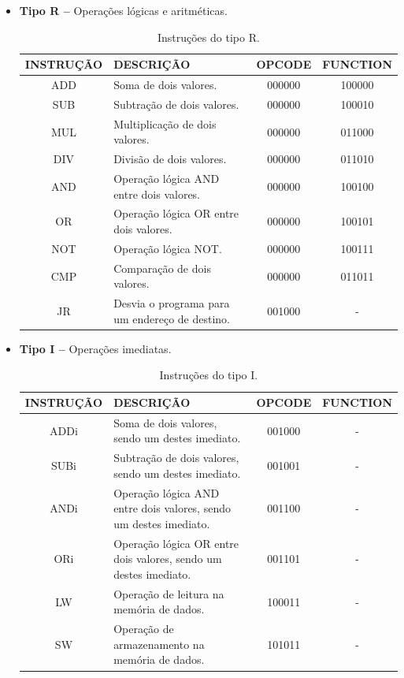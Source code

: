 \documentclass{report}
\begin{document}
  \begin{itemize}
    \item \textbf{Tipo R --} Operações lógicas e aritméticas.
    
	\begin{table}[H]
	\centering
	\begin{tabular}{|c|m{6cm}|c|c|}
  	\hline 
  	\textbf{INSTRUÇÃO} & \textbf{DESCRIÇÃO} & \textbf{OPCODE} & \textbf{FUNCTION} \\ 
  	\hline   	
  	ADD & Soma de dois valores. & 000000 & 100000 \\ \hline
  	SUB & Subtração de dois valores. & 000000 & 100010 \\ \hline
  	MUL & Multiplicação de dois valores. & 000000 & 011000 \\ \hline
  	DIV & Divisão de dois valores. & 000000 & 011010 \\ \hline
  	AND & Operação lógica AND entre dois valores. & 000000 & 100100 \\ \hline
  	OR & Operação lógica OR entre dois valores. & 000000 & 100101 \\ \hline
  	NOT & Operação lógica NOT. & 000000 & 100111 \\ \hline
  	CMP & Comparação de dois valores. & 000000 & 011011 \\ \hline
  	JR & Desvia o programa para um endereço de destino. & 001000 & - \\ \hline
  	\end{tabular} 
  	\caption{Instruções do tipo R.}
  \end{table}    

    \item \textbf{Tipo I --} Operações imediatas.
    
	\begin{table}[H]
	\centering
	\begin{tabular}{|c|m{6cm}|c|c|}
  	\hline 
  	\textbf{INSTRUÇÃO} & \textbf{DESCRIÇÃO} & \textbf{OPCODE} & \textbf{FUNCTION} \\ 
  	\hline 
  	ADDi &  Soma de dois valores, sendo um destes imediato. & 001000 & - \\ \hline
  	SUBi & Subtração de dois valores, sendo um destes imediato. & 001001 & - \\ \hline
  	ANDi & Operação lógica AND entre dois valores, sendo um destes imediato. & 001100 & - \\ \hline
  	ORi & Operação lógica OR entre dois valores, sendo um destes imediato. & 001101 & - \\ \hline
    LW & Operação de leitura na memória de dados. & 100011 & - \\ \hline
    SW & Operação de armazenamento na memória de dados. & 101011 & - \\ \hline
  	\end{tabular} 
  	\caption{Instruções do tipo I.}
  \end{table}
    

\end{itemize}
\end{document}
